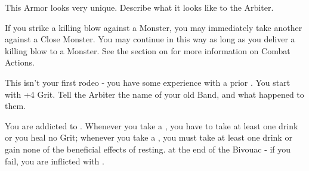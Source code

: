 \begin{multicols*}{2}
    This Armor looks very unique. Describe what it looks like to the Arbiter.

\cbreak


    If you strike a killing blow against a Monster, you may immediately take another  against a Close Monster. You may continue in this way as long as you deliver a killing blow to a Monster. See the section on  for more information on Combat Actions.




    This isn't your first rodeo - you have some experience with a prior . You start with +4 Grit. Tell the Arbiter the name of your old Band, and what happened to them.








    \begin{center}
    \end{center}



    You are addicted to . Whenever you take a , you have to take at least one drink or you heal no Grit; whenever you take a , you must take at least one drink or gain none of the beneficial effects of resting. \RSTRY{\VIG} at the end of the Bivouac - if you fail, you are inflicted with .


\end{multicols*}
